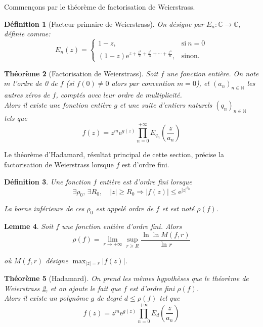 \documentclass[french]{report}
\newtheorem{theorem}{Théorème}[section]
\newtheorem{definition}[theorem]{Définition}
\newtheorem{lemma}[theorem]{Lemme}
\begin{document}
Commençons par le théorème de factorisation de Weierstrass.

\begin{definition}[Facteur primaire de Weierstrass]
  On désigne par $E_n:\mathbb{C}\to\mathbb{C}$, définie comme:
  \begin{equation*}
    E_n(z)=
    \begin{cases}
      1-z, & \text{si}\ n=0\\
      (1-z)\mathrm{e}^{z+\frac{z^2}{2}+\frac{z^3}{3}+\cdots+\frac{z^n}{n}}, & \text{sinon}.
    \end{cases}
  \end{equation*}
\end{definition}

\begin{theorem}[Factorisation de Weierstrass]\label{thm:factorisation-weierstrass}
  Soit $f$ une fonction entière. On note $m$ l'ordre de 0 de $f$ (si $f(0)\neq 0$ alors par convention $m=0$), et $(a_n)_{n\in\mathbb{N}}$ les autres zéros de $f$, comptés avec leur ordre de multiplicité.
  \\

  Alors il existe une fonction entière $g$ et une suite d'entiers naturels $(q_n)_{n\in\mathbb{N}}$ tels que
  \[
    f(z)=z^m\mathrm{e}^{g(z)}\prod_{n=0}^{+\infty}E_{q_n}\left(\frac{z}{a_n}\right)
  \]
\end{theorem}

Le théorème d'Hadamard, résultat principal de cette section, précise la factorisation de Weierstrass lorsque $f$ est d'ordre fini.

\begin{definition}
  Une fonction $f$ entière est d'ordre fini lorsque
  \[
   \exists \rho_0,\,\exists R_0,\quad
   |z|\geq R_0\Longrightarrow|f(z)|\leq\mathrm{e}^{|z|^{\rho_0}}
  \]

  La borne inférieure de ces $\rho_0$ est appelé ordre de $f$ et est noté $\rho(f)$.
\end{definition}

\begin{lemma}
  Soit $f$ une fonction entière d'ordre fini. Alors
  \[
    \rho(f)=\lim_{r\to+\infty}\sup_{r\geq R}
    \frac{\ln\ln M(f,r)}{\ln r}
  \]

  où $M(f,r)$ désigne $\max_{|z|=r}|f(z)|$.
\end{lemma}

\begin{theorem}[Hadamard]\label{thm:factorisation-hadamard}
  On prend les mêmes hypothèses que le théorème de Weierstrass \ref{thm:factorisation-weierstrass}, et on ajoute le fait que $f$ est d'ordre fini $\rho(f)$.
  \\
  Alors il existe un polynôme $g$ de degré $d\leq \rho(f)$ tel que
  \[
    f(z)=z^m\mathrm{e}^{g(z)}\prod_{n=0}^{+\infty}E_d\left(\frac{z}{a_n}\right)
  \]
\end{theorem}
\end{document}
